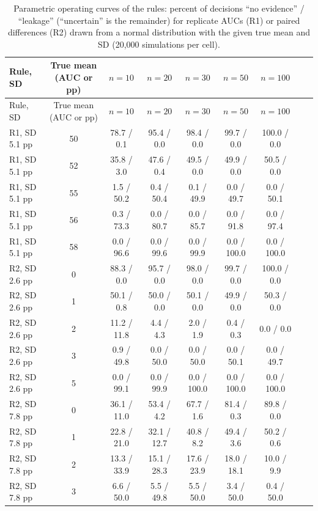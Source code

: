 {\scriptsize
\setlength{\tabcolsep}{3pt}
\begin{longtable}{lcccccccc}
\caption{Parametric operating curves of the rules: percent of decisions ``no evidence'' / ``leakage'' (``uncertain'' is the remainder) for replicate AUCs (R1) or paired differences (R2) drawn from a normal distribution with the given true mean and SD (20,000 simulations per cell).}\label{tab:s2_ocpar}\\
\toprule
Rule, SD & True mean (AUC or pp) & $n=10$ & $n=20$ & $n=30$ & $n=50$ & $n=100$ \\
\midrule
\endfirsthead
\toprule
Rule, SD & True mean (AUC or pp) & $n=10$ & $n=20$ & $n=30$ & $n=50$ & $n=100$ \\
\midrule
\endhead
\bottomrule
\endfoot
R1, SD 5.1 pp & 50 & 78.7 / 0.1 & 95.4 / 0.0 & 98.4 / 0.0 & 99.7 / 0.0 & 100.0 / 0.0 \\
R1, SD 5.1 pp & 52 & 35.8 / 3.0 & 47.6 / 0.4 & 49.5 / 0.0 & 49.9 / 0.0 & 50.5 / 0.0 \\
R1, SD 5.1 pp & 55 & 1.5 / 50.2 & 0.4 / 50.4 & 0.1 / 49.9 & 0.0 / 49.7 & 0.0 / 50.1 \\
R1, SD 5.1 pp & 56 & 0.3 / 73.3 & 0.0 / 80.7 & 0.0 / 85.7 & 0.0 / 91.8 & 0.0 / 97.4 \\
R1, SD 5.1 pp & 58 & 0.0 / 96.6 & 0.0 / 99.6 & 0.0 / 99.9 & 0.0 / 100.0 & 0.0 / 100.0 \\
R2, SD 2.6 pp & 0 & 88.3 / 0.0 & 95.7 / 0.0 & 98.0 / 0.0 & 99.7 / 0.0 & 100.0 / 0.0 \\
R2, SD 2.6 pp & 1 & 50.1 / 0.8 & 50.0 / 0.0 & 50.1 / 0.0 & 49.9 / 0.0 & 50.3 / 0.0 \\
R2, SD 2.6 pp & 2 & 11.2 / 11.8 & 4.4 / 4.3 & 2.0 / 1.9 & 0.4 / 0.3 & 0.0 / 0.0 \\
R2, SD 2.6 pp & 3 & 0.9 / 49.8 & 0.0 / 50.0 & 0.0 / 50.0 & 0.0 / 50.1 & 0.0 / 49.7 \\
R2, SD 2.6 pp & 5 & 0.0 / 99.1 & 0.0 / 99.9 & 0.0 / 100.0 & 0.0 / 100.0 & 0.0 / 100.0 \\
R2, SD 7.8 pp & 0 & 36.1 / 11.0 & 53.4 / 4.2 & 67.7 / 1.6 & 81.4 / 0.3 & 89.8 / 0.0 \\
R2, SD 7.8 pp & 1 & 22.8 / 21.0 & 32.1 / 12.7 & 40.8 / 8.2 & 49.4 / 3.6 & 50.2 / 0.6 \\
R2, SD 7.8 pp & 2 & 13.3 / 33.9 & 15.1 / 28.3 & 17.6 / 23.9 & 18.0 / 18.1 & 10.0 / 9.9 \\
R2, SD 7.8 pp & 3 & 6.6 / 50.0 & 5.5 / 49.8 & 5.5 / 50.0 & 3.4 / 50.0 & 0.4 / 50.0 \\
\end{longtable}
}

